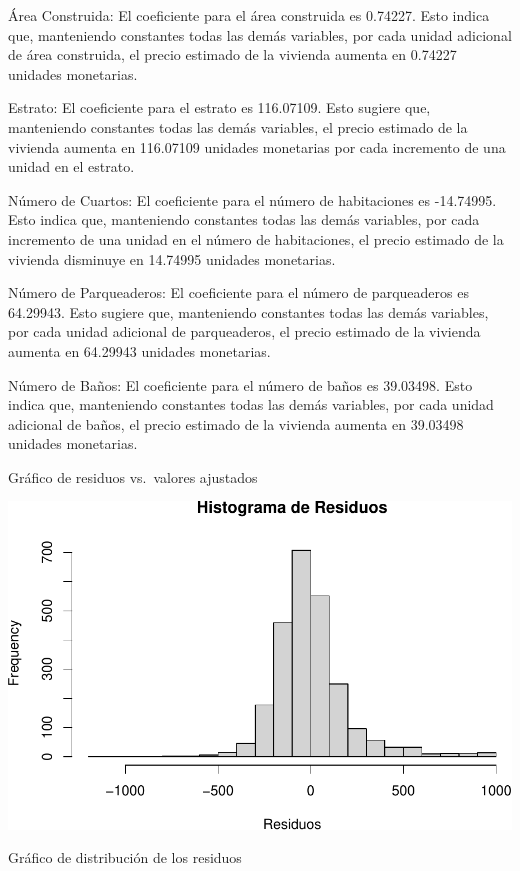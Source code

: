 \documentclass[
]{article}
\begin{document}
Área Construida: El coeficiente para el área construida es 0.74227. Esto
indica que, manteniendo constantes todas las demás variables, por cada
unidad adicional de área construida, el precio estimado de la vivienda
aumenta en 0.74227 unidades monetarias.

Estrato: El coeficiente para el estrato es 116.07109. Esto sugiere que,
manteniendo constantes todas las demás variables, el precio estimado de
la vivienda aumenta en 116.07109 unidades monetarias por cada incremento
de una unidad en el estrato.

Número de Cuartos: El coeficiente para el número de habitaciones es
-14.74995. Esto indica que, manteniendo constantes todas las demás
variables, por cada incremento de una unidad en el número de
habitaciones, el precio estimado de la vivienda disminuye en 14.74995
unidades monetarias.

Número de Parqueaderos: El coeficiente para el número de parqueaderos es
64.29943. Esto sugiere que, manteniendo constantes todas las demás
variables, por cada unidad adicional de parqueaderos, el precio estimado
de la vivienda aumenta en 64.29943 unidades monetarias.

Número de Baños: El coeficiente para el número de baños es 39.03498.
Esto indica que, manteniendo constantes todas las demás variables, por
cada unidad adicional de baños, el precio estimado de la vivienda
aumenta en 39.03498 unidades monetarias.

Gráfico de residuos vs.~valores ajustados

\includegraphics{A2_U2_InformeEjecutivo_files/figure-latex/unnamed-chunk-18-1.pdf}

Gráfico de distribución de los residuos
\end{document}
